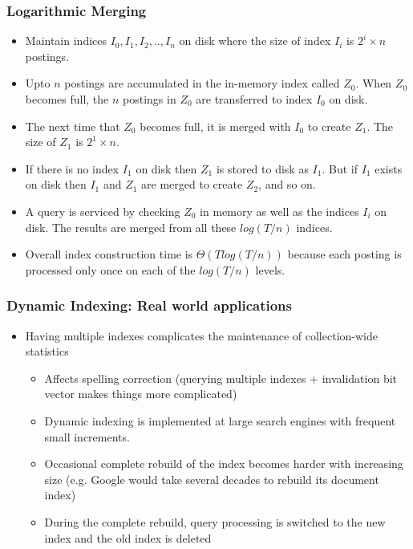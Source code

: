 \documentclass{article}
\begin{document}
\subsubsection{Logarithmic Merging}
\begin{itemize}
    \item Maintain indices $I_0, I_1, I_2, .., I_n$ on disk where the size of index $I_i$ is $2^i \times n$ postings. 
    
    \item Upto $n$ postings are accumulated in the in-memory index called $Z_0$. When $Z_0$ becomes full, the $n$ postings in $Z_0$ are transferred to index $I_0$ on disk. 
    
    \item The next time that $Z_0$ becomes full, it is merged with $I_0$ to create $Z_1$. The size of $Z_1$ is $2^1\times n$.
    
    \item If there is no index $I_1$ on disk then $Z_1$ is stored to disk as $I_1$. But if $I_1$ exists on disk then $I_1$ and $Z_1$ are merged to create $Z_2$, and so on. 
    
    \item A query is serviced by checking $Z_0$ in memory as well as the indices $I_i$ on disk. The results are merged from all these $log(T/n)$ indices. 
    
    \item Overall index construction time is $\Theta(T log(T/n))$ because each posting is processed only once on each of the $log(T/n)$ levels.
\end{itemize}
\subsubsection{Dynamic Indexing: Real world applications}
\begin{itemize}
    \item Having multiple indexes complicates the maintenance of collection-wide statistics
    \begin{itemize}
        \item Affects spelling correction (querying multiple indexes + invalidation bit vector makes things more complicated)
        
        \item Dynamic indexing is implemented at large search engines with frequent small increments.
        
        \item Occasional complete rebuild of the index becomes harder with increasing size (e.g. Google would take several decades to rebuild its document index)
        
        \item During the complete rebuild, query processing is switched to the new index and the old index is deleted
    \end{itemize}
\end{itemize}
\end{document}
